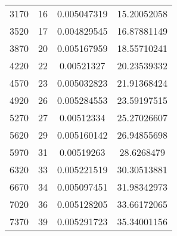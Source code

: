 \documentclass[a4paper,12pt]{article} %
\begin{document}
\begin{table}[H]
{\begin{tabular}{|c|c|c|c|}
			3170                                               & 16                   & 0.005047319              & 15.20052058                                          \\
			3520                                               & 17                   & 0.004829545              & 16.87881149                                          \\
			3870                                               & 20                   & 0.005167959              & 18.55710241                                          \\
			4220                                               & 22                   & 0.00521327               & 20.23539332                                          \\
			4570                                               & 23                   & 0.005032823              & 21.91368424                                          \\
			4920                                               & 26                   & 0.005284553              & 23.59197515                                          \\
			5270                                               & 27                   & 0.00512334               & 25.27026607                                          \\
			5620                                               & 29                   & 0.005160142              & 26.94855698                                          \\
			5970                                               & 31                   & 0.00519263               & 28.6268479                                           \\
			6320                                               & 33                   & 0.005221519              & 30.30513881                                          \\
			6670                                               & 34                   & 0.005097451              & 31.98342973                                          \\
			7020                                               & 36                   & 0.005128205              & 33.66172065                                          \\
			7370                                               & 39                   & 0.005291723              & 35.34001156                                          \\

\end{tabular}}
\end{table}
\end{document}

